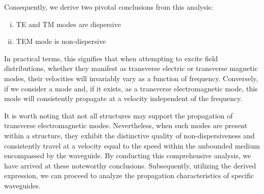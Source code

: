 Consequently, we derive two pivotal conclusions from this analysis:
\begin{enumerate}[(i)]
\item TE and TM modes are dispersive
\item TEM mode is non-dispersive
\end{enumerate}
In practical terms, this signifies that when attempting to excite field distributions, whether they manifest as transverse electric or transverse magnetic modes, their velocities will invariably vary as a function of frequency. Conversely, if we consider a mode and, if it exists, as a transverse electromagnetic mode, this mode will consistently propagate at a velocity independent of the frequency.

It is worth noting that not all structures may support the propagation of transverse electromagnetic modes. Nevertheless, when such modes are present within a structure, they exhibit the distinctive quality of non-dispersiveness and consistently travel at a velocity equal to the speed within the unbounded medium encompassed by the waveguide. By conducting this comprehensive analysis, we have arrived at these noteworthy conclusions. Subsequently, utilizing the derived expression, we can proceed to analyze the propagation characteristics of specific waveguides.

